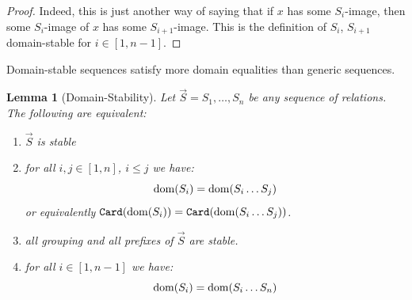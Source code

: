 \documentclass{lmcs}
\newtheorem{lemma}[theorem]{Lemma}
\begin{document}
\begin{proof}
Indeed, this is just another way of saying that if $x$ has some $S_i$-image,
then some $S_i$-image of $x$ has some $S_{i+1}$-image. This is the definition
of $S_i$, $S_{i+1}$ domain-stable for $i \in [1,n-1]$. 
\end{proof}

Domain-stable sequences satisfy more domain equalities than generic sequences.


\begin{lemma}[Domain-Stability]
\label{lemma-domain-stability}
Let $\vec{S}=S_1, \ldots, S_n$ be any sequence of relations. The following are equivalent:

\begin{enumerate}
\item
\label{lemma-domain-stability-01}
$\vec{S}$ is stable

\item
\label{lemma-domain-stability-02}
for all $i, j \in [1, n]$, $i \le j$ we have:
$$
{\rm dom}(S_i) =  {\rm dom}(S_i \ldots S_j)
$$
or equivalently ${\tt Card}({\rm dom}(S_i)) =  {\tt Card}({\rm dom}(S_i \ldots S_j))$.

\item
\label{lemma-domain-stability-03}
all grouping and all prefixes of $\vec{S}$ are stable.

\item 
\label{lemma-domain-stability-04}
for all $i \in [1,n-1]$ we have:
$$
{\rm dom}(S_i) = {\rm dom}(S_i \ldots S_n)
$$

\end{enumerate}



\end{lemma}
\end{document}
